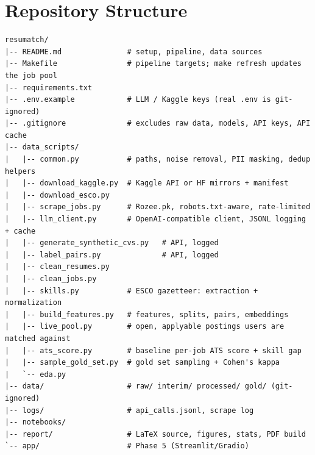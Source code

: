 \documentclass[11pt,a4paper]{article}
\begin{document}
\section{Repository Structure}
\begin{verbatim}
resumatch/
|-- README.md               # setup, pipeline, data sources
|-- Makefile                # pipeline targets; make refresh updates the job pool
|-- requirements.txt
|-- .env.example            # LLM / Kaggle keys (real .env is git-ignored)
|-- .gitignore              # excludes raw data, models, API keys, API cache
|-- data_scripts/
|   |-- common.py           # paths, noise removal, PII masking, dedup helpers
|   |-- download_kaggle.py  # Kaggle API or HF mirrors + manifest
|   |-- download_esco.py
|   |-- scrape_jobs.py      # Rozee.pk, robots.txt-aware, rate-limited
|   |-- llm_client.py       # OpenAI-compatible client, JSONL logging + cache
|   |-- generate_synthetic_cvs.py   # API, logged
|   |-- label_pairs.py              # API, logged
|   |-- clean_resumes.py
|   |-- clean_jobs.py
|   |-- skills.py           # ESCO gazetteer: extraction + normalization
|   |-- build_features.py   # features, splits, pairs, embeddings
|   |-- live_pool.py        # open, applyable postings users are matched against
|   |-- ats_score.py        # baseline per-job ATS score + skill gap
|   |-- sample_gold_set.py  # gold set sampling + Cohen's kappa
|   `-- eda.py
|-- data/                   # raw/ interim/ processed/ gold/ (git-ignored)
|-- logs/                   # api_calls.jsonl, scrape log
|-- notebooks/
|-- report/                 # LaTeX source, figures, stats, PDF build
`-- app/                    # Phase 5 (Streamlit/Gradio)
\end{verbatim}

\end{document}

